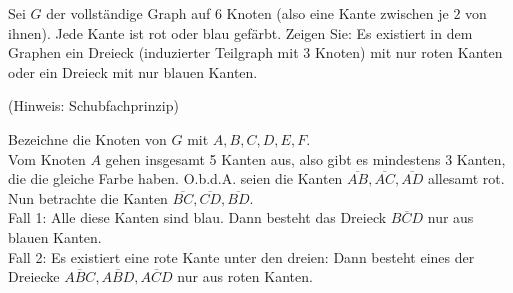 
\begin{exercise}

Sei $G$ der vollständige Graph auf $6$ Knoten (also eine Kante zwischen je $2$ von ihnen).
Jede Kante ist rot oder blau gefärbt.
Zeigen Sie:
Es existiert in dem Graphen ein Dreieck (induzierter Teilgraph mit $3$ Knoten) mit nur roten Kanten oder ein Dreieck mit nur blauen Kanten.

(Hinweis: Schubfachprinzip)

\end{exercise}


\begin{solution}



Bezeichne die Knoten von $G$ mit $A,B,C,D,E,F$. \\
Vom Knoten $A$ gehen insgesamt 5 Kanten aus, also gibt es mindestens 3 Kanten, die die gleiche Farbe haben.
O.b.d.A. seien die Kanten $\overline{AB}, \overline{AC}, \overline{AD}$ allesamt rot. \\
Nun betrachte die Kanten $\overline{BC}, \overline{CD}, \overline{BD}$. \\
Fall 1: Alle diese Kanten sind blau. Dann besteht das Dreieck $\overline{BCD}$ nur aus blauen Kanten. \\
Fall 2: Es existiert eine rote Kante unter den dreien: Dann besteht eines
der Dreiecke $\overline{ABC}, \overline{ABD}, \overline{ACD}$ nur aus roten Kanten.

\end{solution}

